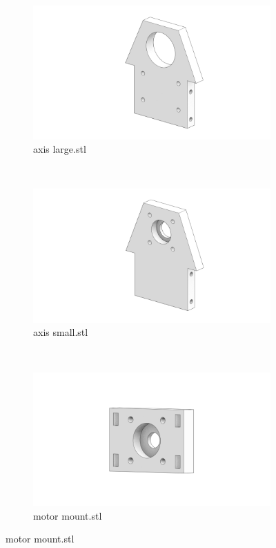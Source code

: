 \documentclass[a4paper]{article}
\begin{document}
\begin{figure}
       \centering
        \begin{subfigure}[b]{0.3\textwidth}
                \includegraphics[width=\textwidth]{figures/axis_large.png}
                \caption*{axis large.stl }
        \end{subfigure}
        ~ 
        \begin{subfigure}[b]{0.3\textwidth}
                \includegraphics[width=\textwidth]{figures/axis_small.png}
                \caption*{axis small.stl }
        \end{subfigure}
        ~ 
        \begin{subfigure}[b]{0.3\textwidth}
                \includegraphics[width=\textwidth]{figures/motor_mount.png}
                \caption*{motor mount.stl }
        \end{subfigure}
\end{figure}
\end{document}
